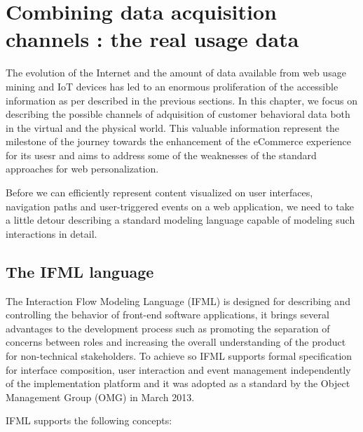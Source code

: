 \chead{}
\chapter{Combining data acquisition channels : the real usage data}

The evolution of the Internet and the amount of data available from web usage mining and IoT devices has led to an enormous proliferation of the accessible information as per described in the previous sections.  In this chapter, we focus on describing the possible channels of adquisition of customer behavioral data both in the virtual and the physical world. This valuable information represent the milestone of the journey towards the enhancement of the eCommerce experience for its usesr and aims to address some of the weaknesses of the standard approaches for web personalization.

Before we can efficiently represent content visualized on user interfaces, navigation paths and user-triggered events on a web application, we need to take a little detour describing a standard modeling language capable of modeling such interactions in detail.

\section{The IFML language}
\label{the-ifml-language}

The Interaction Flow Modeling Language (IFML)\cite{IFML-1, IFML-2} is designed for describing and controlling the behavior of front-end software applications, it brings several advantages to the development process such as promoting the separation of concerns between roles and increasing the overall understanding of the product for non-technical stakeholders. To achieve so IFML supports formal specification for interface composition, user interaction and event management independently of the implementation platform and it was adopted as a standard by the Object Management Group (OMG) in March 2013.

IFML supports the following concepts: 

